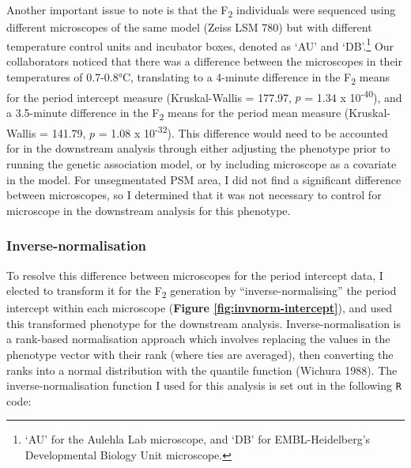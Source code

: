 \documentclass[
]{book}
\newcommand{\passthrough}[1]{#1}
\begin{document}
Another important issue to note is that the F\textsubscript{2} individuals were sequenced using different microscopes of the same model (Zeiss LSM 780) but with different temperature control units and incubator boxes, denoted as `AU' and `DB'.\footnote{`AU' for the Aulehla Lab microscope, and `DB' for EMBL-Heidelberg's Developmental Biology Unit microscope.} Our collaborators noticed that there was a difference between the microscopes in their temperatures of 0.7-0.8°C, translating to a 4-minute difference in the F\textsubscript{2} means for the period intercept measure (Kruskal-Wallis = 177.97, \(p\) = 1.34 x 10\textsuperscript{-40}), and a 3.5-minute difference in the F\textsubscript{2} means for the period mean measure (Kruskal-Wallis = 141.79, \(p\) = 1.08 x 10\textsuperscript{-32}). This difference would need to be accounted for in the downstream analysis through either adjusting the phenotype prior to running the genetic association model, or by including microscope as a covariate in the model. For unsegmentated PSM area, I did not find a significant difference between microscopes, so I determined that it was not necessary to control for microscope in the downstream analysis for this phenotype.

\clearpage

\hypertarget{inverse-norm-sec}{%
\subsubsection{Inverse-normalisation}\label{inverse-norm-sec}}

To resolve this difference between microscopes for the period intercept data, I elected to transform it for the F\textsubscript{2} generation by ``inverse-normalising'' the period intercept within each microscope (\textbf{Figure \ref{fig:invnorm-intercept}}), and used this transformed phenotype for the downstream analysis. Inverse-normalisation is a rank-based normalisation approach which involves replacing the values in the phenotype vector with their rank (where ties are averaged), then converting the ranks into a normal distribution with the quantile function (Wichura 1988). The inverse-normalisation function I used for this analysis is set out in the following \passthrough{\lstinline!R!} code:
\end{document}
